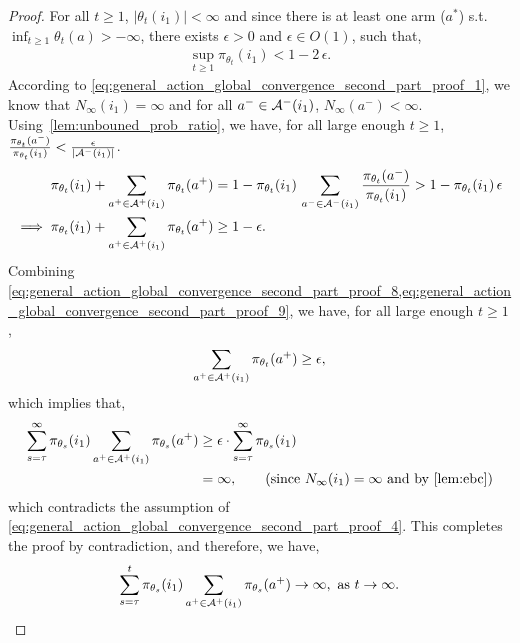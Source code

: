 \begin{proof}
For all $t \geq 1$, $|\theta_t(i_1)| < \infty$ and since there is at least one arm ($a^*$) s.t. $\inf_{t \geq 1} \theta_t(a) > -\infty$, there exists $\epsilon > 0$  and $\epsilon \in O(1)$, such that,
\begin{align}
\label{eq:general_action_global_convergence_second_part_proof_8}
    \sup_{t \ge 1}{ \pi_{\theta_t}(i_1)} < 1 - 2 \, \epsilon.
\end{align}
According to \cref{eq:general_action_global_convergence_second_part_proof_1}, we know that $N_\infty(i_1) = \infty$ and for all $a^- \in {\mathcal{A}}^{-}(i_1)$, $N_\infty(a^-) < \infty$. Using~\cref{lem:unbouned_prob_ratio}, we have, for all large enough $t \ge 1$, $\frac{\pi_{\theta_t}(a^-)}{\pi_{\theta_t}(i_1)} < \frac{\epsilon}{|{\mathcal{A}}^{-}(i_1)|}$. 
\begin{align}
    \pi_{\theta_t}(i_1) + \sum_{a^+ \in {\mathcal{A}}^+(i_1)}{ \pi_{\theta_t}(a^+) } &= 1 - \pi_{\theta_t}(i_1) \,  \sum_{a^- \in {\mathcal{A}}^-(i_1)}{ \frac{\pi_{\theta_t}(a^-)}{\pi_{\theta_t}(i_1)} } > 1 - \pi_{\theta_t}(i_1) \, \epsilon \\
    \implies \pi_{\theta_t}(i_1) + \sum_{a^+ \in {\mathcal{A}}^+(i_1)}{ \pi_{\theta_t}(a^+) } & \ge 1 - \epsilon. \label{eq:general_action_global_convergence_second_part_proof_9}
\end{align}
Combining \cref{eq:general_action_global_convergence_second_part_proof_8,eq:general_action_global_convergence_second_part_proof_9}, we have, for all large enough $t \ge 1$,
\begin{align}
\label{eq:general_action_global_convergence_second_part_proof_10}
    \sum_{a^+ \in {\mathcal{A}}^+(i_1)}{ \pi_{\theta_t}(a^+) } \ge \epsilon,
\end{align}
which implies that,
\begin{align}
    \sum_{s=\tau}^{\infty} \pi_{\theta_s}(i_1) \sum_{a^+ \in \gA^+(i_1)}{ \pi_{\theta_s}(a^+) } &\ge \epsilon \cdot \sum_{s=\tau}^{\infty} \pi_{\theta_s}(i_1) \\
    &= \infty, \qquad \left( \text{since $N_\infty(i_1) = \infty$ and by \cref{lem:ebc}} \right) \label{eq:general_action_global_convergence_second_part_proof_11}
\end{align}
which contradicts the assumption of \cref{eq:general_action_global_convergence_second_part_proof_4}. This completes the proof by contradiction, and therefore, we have,
\begin{align}
\label{eq:general_action_global_convergence_second_part_proof_12}
    \sum_{s=\tau}^t \pi_{\theta_s}(i_1) \sum_{a^+ \in \gA^+(i_1)}{ \pi_{\theta_s}(a^+) } \to \infty, \text{ as } t \to \infty.

\end{align}
\end{proof}
